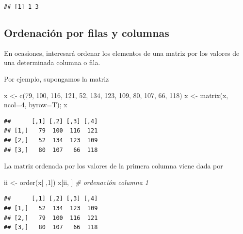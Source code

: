 \documentclass[
]{book}
\newenvironment{Shaded}{\begin{snugshade}}{\end{snugshade}}
\newcommand{\AttributeTok}[1]{\textcolor[rgb]{0.77,0.63,0.00}{#1}}
\newcommand{\CommentTok}[1]{\textcolor[rgb]{0.56,0.35,0.01}{\textit{#1}}}
\newcommand{\DecValTok}[1]{\textcolor[rgb]{0.00,0.00,0.81}{#1}}
\newcommand{\FunctionTok}[1]{\textcolor[rgb]{0.00,0.00,0.00}{#1}}
\newcommand{\NormalTok}[1]{#1}
\newcommand{\OtherTok}[1]{\textcolor[rgb]{0.56,0.35,0.01}{#1}}
\theoremstyle{break}
\theoremstyle{nonumberplain}
\begin{document}
\begin{verbatim}
## [1] 1 3
\end{verbatim}

\hypertarget{ordenaciuxf3n-por-filas-y-columnas}{%
\subsection{Ordenación por filas y columnas}\label{ordenaciuxf3n-por-filas-y-columnas}}

En ocasiones, interesará ordenar los elementos de una matriz por los valores de una determinada columna o fila.

Por ejemplo, supongamos la matriz

\begin{Shaded}
\begin{Highlighting}[]
\NormalTok{x }\OtherTok{\textless{}{-}} \FunctionTok{c}\NormalTok{(}\DecValTok{79}\NormalTok{, }\DecValTok{100}\NormalTok{, }\DecValTok{116}\NormalTok{, }\DecValTok{121}\NormalTok{, }\DecValTok{52}\NormalTok{, }\DecValTok{134}\NormalTok{, }\DecValTok{123}\NormalTok{, }\DecValTok{109}\NormalTok{, }\DecValTok{80}\NormalTok{, }\DecValTok{107}\NormalTok{, }\DecValTok{66}\NormalTok{, }\DecValTok{118}\NormalTok{)}
\NormalTok{x }\OtherTok{\textless{}{-}} \FunctionTok{matrix}\NormalTok{(x, }\AttributeTok{ncol=}\DecValTok{4}\NormalTok{, }\AttributeTok{byrow=}\NormalTok{T); x}
\end{Highlighting}
\end{Shaded}

\begin{verbatim}
##      [,1] [,2] [,3] [,4]
## [1,]   79  100  116  121
## [2,]   52  134  123  109
## [3,]   80  107   66  118
\end{verbatim}

La matriz ordenada por los valores de la primera columna viene dada por

\begin{Shaded}
\begin{Highlighting}[]
\NormalTok{ii }\OtherTok{\textless{}{-}} \FunctionTok{order}\NormalTok{(x[ ,}\DecValTok{1}\NormalTok{])}
\NormalTok{x[ii, ]  }\CommentTok{\# ordenación columna 1}
\end{Highlighting}
\end{Shaded}

\begin{verbatim}
##      [,1] [,2] [,3] [,4]
## [1,]   52  134  123  109
## [2,]   79  100  116  121
## [3,]   80  107   66  118
\end{verbatim}
\end{document}
